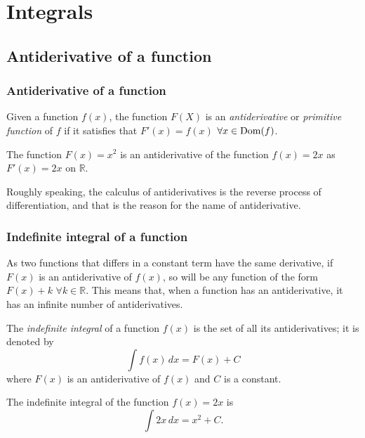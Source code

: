\section{Integrals}



\subsection{Antiderivative of a function}
\begin{frame}
\frametitle{Antiderivative of a function}
\begin{definition}
Given a function $f(x)$, the function $F(X)$ is an \emph{antiderivative} or \emph{primitive function} of $f$ if it satisfies that $F'(x)=f(x)$ $\forall x \in {\operatorname{Dom}}(f)$.
\end{definition}

 The function $F(x)=x^2$ is an antiderivative of the function $f(x)=2x$ as $F'(x)=2x$ on $\mathbb{R}$.

Roughly speaking, the calculus of antiderivatives is the reverse process of differentiation, and that is the reason for the name of antiderivative. 
\end{frame}


\begin{frame}
\frametitle{Indefinite integral of a function}
As two functions that differs in a constant term have the same derivative, if $F(x)$ is an antiderivative of $f(x)$, so will be any function of the form $F(x)+k$ $\forall k \in \mathbb{R}$.
This means that, when a function has an antiderivative, it has an infinite number of antiderivatives. 

\begin{definition}
The \emph{indefinite integral} of a function $f(x)$ is the set of all its antiderivatives; it is denoted by
\[
\int{f(x)}\,dx=F(x)+C
\]
where $F(x)$ is an antiderivative of $f(x)$ and $C$ is a constant.
\end{definition}

 The indefinite integral of the function $f(x)=2x$ is
\[\int 2x\, dx = x^2+C.\]
\end{frame}


